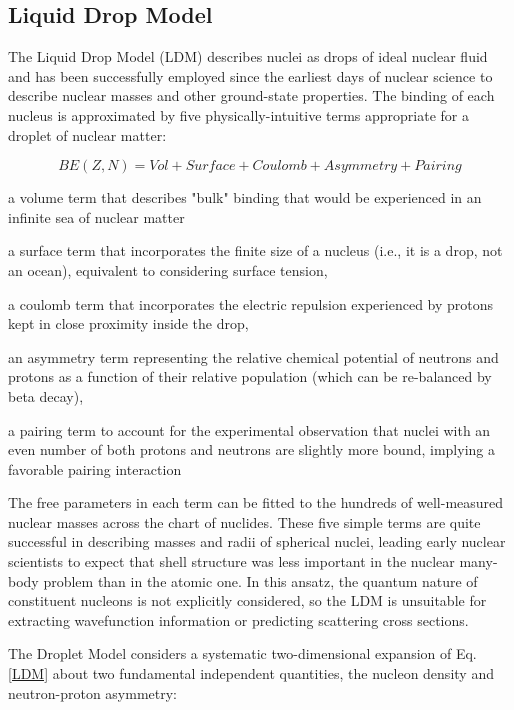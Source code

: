 \subsection{Liquid Drop Model}

The Liquid Drop Model (LDM) describes nuclei as drops of ideal nuclear fluid and
has been successfully employed since the earliest days of nuclear science to
describe nuclear masses and other ground-state properties. The binding of each
nucleus is approximated by five physically-intuitive terms appropriate for
a droplet of nuclear matter:

\begin{equation} \label{LDM}
    BE(Z, N) = Vol + Surface + Coulomb + Asymmetry + Pairing
\end{equation}

a volume term that describes "bulk" binding that would be experienced in an
infinite sea of nuclear matter

a surface term that incorporates the finite size of a nucleus (i.e., it is a
drop, not an ocean), equivalent to considering surface tension,

a coulomb term that incorporates the electric repulsion experienced by protons
kept in close proximity inside the drop,

an asymmetry term representing the relative chemical potential of neutrons and
protons as a function of their relative population (which can be re-balanced by
beta decay),

a pairing term to account for the experimental observation that nuclei with an
even number of both protons and neutrons are slightly more bound, implying a
favorable pairing interaction

The free parameters in each term can be fitted to the hundreds of well-measured nuclear masses
across the chart of nuclides. These five simple terms are quite successful
in describing masses and radii of spherical nuclei, leading early nuclear
scientists to expect that shell structure was less important in the nuclear
many-body problem than in the atomic one. In this ansatz, the quantum
nature of constituent nucleons is not explicitly considered, so the LDM is  
unsuitable for extracting wavefunction information or predicting scattering
cross sections.

The Droplet Model \cite{MyersAndSwiatecki} considers a systematic two-dimensional expansion of
Eq. \ref{LDM} about two fundamental independent quantities, the nucleon density
and neutron-proton asymmetry:

